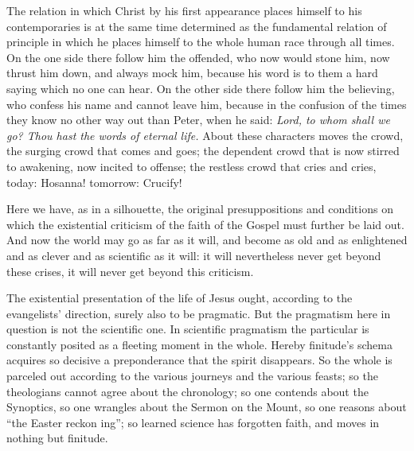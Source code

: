\documentclass[12pt,a4paper]{book}
\begin{document}
The relation in which Christ by his first appearance places himself to his contemporaries is
at the same time determined as the fundamental relation of principle in which he places
himself to the whole human race through all times. On the one side there follow him the
offended, who now would stone him, now thrust him down, and always mock him, because his
word is to them a hard saying which no one can hear. On the other side there follow him the
believing, who confess his name and cannot leave him, because in the confusion of the times
they know no other way out than Peter, when he said: \emph{Lord, to whom shall we go? Thou
hast the words of eternal life.} About these characters moves the crowd, the surging crowd
that comes and goes; the dependent crowd that is now stirred to awakening, now incited to
offense; the restless crowd that cries and cries, today: Hosanna! tomorrow: Crucify!

Here we have, as in a silhouette, the original presuppositions and conditions on which the
existential criticism of the faith of the Gospel must further be laid out. And now the world
may go as far as it will, and become as old and as enlightened and as clever and as
scientific as it will: it will nevertheless never get beyond these crises, it will never get
beyond this criticism.

The existential presentation of the life of Jesus ought, according to the evangelists'
direction, surely also to be pragmatic. But the pragmatism here in question is not the
scientific one. In scientific pragmatism the particular is constantly posited as a fleeting
moment in the whole. Hereby finitude's schema acquires so decisive a preponderance that the
spirit disappears. So the whole is parceled out according to the various journeys and the
various feasts; so the theologians cannot agree about the chronology; so one contends about
the Synoptics, so one wrangles about the Sermon on the Mount, so one reasons about ``the
Easter reckon%
ing''; so learned science has forgotten faith, and moves in nothing but finitude.
\end{document}
